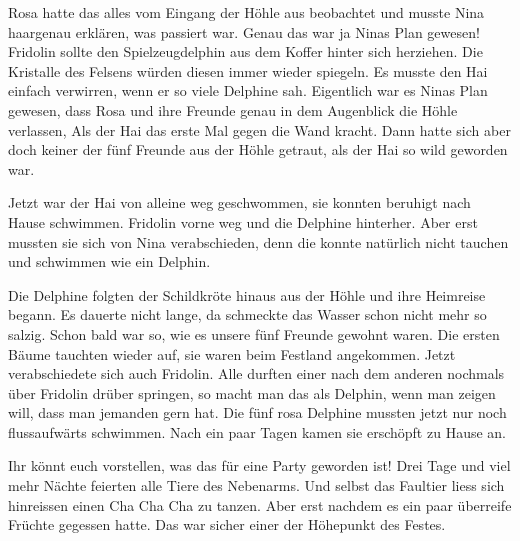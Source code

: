 Rosa hatte das alles vom Eingang der Höhle aus beobachtet und musste Nina haargenau erklären, was passiert war. Genau das war ja Ninas Plan gewesen! Fridolin sollte den Spielzeugdelphin aus dem Koffer hinter sich herziehen. Die Kristalle des Felsens würden diesen immer wieder spiegeln. Es musste den Hai einfach verwirren, wenn er so viele Delphine sah. Eigentlich war es Ninas Plan gewesen, dass Rosa und ihre Freunde genau in dem Augenblick die Höhle verlassen, Als der Hai das erste Mal gegen die Wand kracht. Dann hatte sich aber doch keiner der fünf Freunde aus der Höhle getraut, als der Hai so wild geworden war.

Jetzt war der Hai von alleine weg geschwommen, sie konnten beruhigt nach Hause schwimmen. Fridolin vorne weg und die Delphine hinterher. Aber erst mussten sie sich von Nina verabschieden, denn die konnte natürlich nicht tauchen und schwimmen wie ein Delphin. 

Die Delphine folgten der Schildkröte hinaus aus der Höhle und ihre Heimreise begann. Es dauerte nicht lange, da schmeckte das Wasser schon nicht mehr so salzig. Schon bald war so, wie es unsere fünf Freunde gewohnt waren. Die ersten Bäume tauchten wieder auf, sie waren beim Festland angekommen. Jetzt verabschiedete sich auch Fridolin. Alle durften einer nach dem anderen nochmals über Fridolin drüber springen, so macht man das als Delphin, wenn man zeigen will, dass man jemanden gern hat. Die fünf rosa Delphine mussten jetzt nur noch flussaufwärts schwimmen. Nach ein paar Tagen kamen sie erschöpft zu Hause an.

Ihr könnt euch vorstellen, was das für eine Party geworden ist! Drei Tage und viel mehr Nächte feierten alle Tiere des Nebenarms. Und selbst das Faultier liess sich hinreissen einen Cha Cha Cha zu tanzen. Aber erst nachdem es ein paar überreife Früchte gegessen hatte. Das war sicher einer der Höhepunkt des Festes. 

